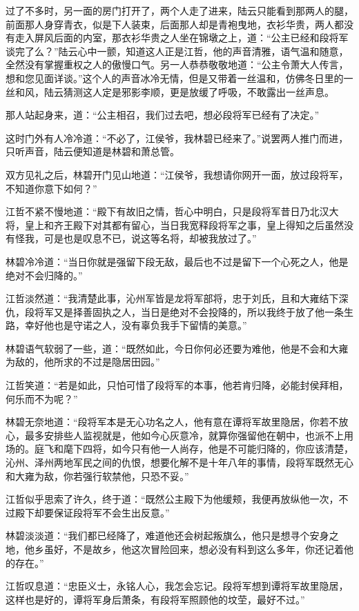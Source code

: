 过了不多时，另一面的房门打开了，两个人走了进来，陆云只能看到那两人的腿，前面那人身穿青衣，似是下人装束，后面那人却是青袍曳地，衣衫华贵，两人都没有走入屏风后面的内室，那衣衫华贵之人坐在锦墩之上，道：“公主已经和段将军谈完了么？”陆云心中一颤，知道这人正是江哲，他的声音清雅，语气温和随意，全然没有掌握重权之人的傲慢口气。另一人恭恭敬敬地道：“公主令萧大人传言，想和您见面详谈。”这个人的声音冰冷无情，但是又带着一丝温和，仿佛冬日里的一丝和风，陆云猜测这人定是邪影李顺，更是放缓了呼吸，不敢露出一丝声息。

那人站起身来，道：“公主相召，我们过去吧，想必段将军已经有了决定。”

这时门外有人冷冷道：“不必了，江侯爷，我林碧已经来了。”说罢两人推门而进，只听声音，陆云便知道是林碧和萧总管。

双方见礼之后，林碧开门见山地道：“江侯爷，我想请你网开一面，放过段将军，不知道你意下如何？”

江哲不紧不慢地道：“殿下有故旧之情，哲心中明白，只是段将军昔日乃北汉大将，皇上和齐王殿下对其都有留心，当日我宽释段将军之事，皇上得知之后虽然没有怪我，可是也是叹息不已，说这等名将，却被我放过了。”

林碧冷冷道：“当日你就是强留下段无敌，最后也不过是留下一个心死之人，他是绝对不会归降的。”

江哲淡然道：“我清楚此事，沁州军皆是龙将军部将，忠于刘氏，且和大雍结下深仇，段将军又是择善固执之人，当日是绝对不会投降的，所以我终于放了他一条生路，幸好他也是守诺之人，没有辜负我手下留情的美意。”

林碧语气软弱了一些，道：“既然如此，今日你何必还要为难他，他是不会和大雍为敌的，他所求的不过是隐居田园。”

江哲笑道：“若是如此，只怕可惜了段将军的本事，他若肯归降，必能封侯拜相，何乐而不为呢？”

林碧无奈地道：“段将军本是无心功名之人，他有意在谭将军故里隐居，你若不放心，最多安排些人监视就是，他如今心灰意冷，就算你强留他在朝中，也派不上用场的。庭飞和麾下四将，如今只有他一人尚存，他是不可能归降的，你应该清楚，沁州、泽州两地军民之间的仇恨，想要化解不是十年八年的事情，段将军既然无心和大雍为敌，你若强行软禁他，只恐不妥。”

江哲似乎思索了许久，终于道：“既然公主殿下为他缓颊，我便再放纵他一次，不过殿下却要保证段将军不会生出反意。”

林碧淡淡道：“我们都已经降了，难道他还会树起叛旗么，他只是想寻个安身之地，他乡虽好，不是故乡，他这次冒险回来，想必没有料到这么多年，你还记着他的存在。”

江哲叹息道：“忠臣义士，永铭人心，我怎会忘记。段将军想到谭将军故里隐居，这样也是好的，谭将军身后萧条，有段将军照顾他的坟茔，最好不过。”

